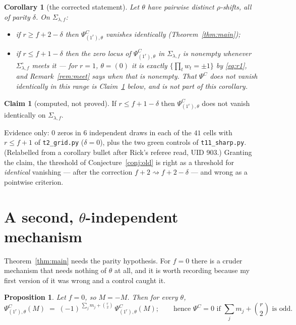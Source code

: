 \documentclass[11pt]{article}
\newtheorem{proposition}[theorem]{Proposition}
\newtheorem{corollary}[theorem]{Corollary}
\theoremstyle{definition}
\newtheorem{claim}{Claim}
\theoremstyle{remark}
\newcommand{\PsiC}{\Psi^{C}}
\newcommand{\bftheta}{\theta}
\begin{document}
\begin{corollary}[the corrected statement]\label{cor:corrected}
Let $\bftheta$ have pairwise distinct $\rho$-shifts, all of parity $\delta$. On
$\Sigma_{\lambda,f}$:
\begin{itemize}
\item if $r\ge f+2-\delta$ then $\PsiC_{(1^r),\bftheta}$ vanishes \emph{identically}
      (Theorem~\ref{thm:main});
\item if $r\le f+1-\delta$ then the zero locus of $\PsiC_{(1^r),\bftheta}$ in
      $\Sigma_{\lambda,f}$ is nonempty whenever $\Sigma^{\circ}_{\lambda,f}$ meets
      it --- for $r=1$, $\bftheta=(0)$ it is exactly $\{\prod_tw_t=\pm1\}$ by
      \eqref{eq:r1}, and Remark~\ref{rem:meet} says when that is nonempty. That
      $\PsiC$ does \emph{not} vanish identically in this range is Claim~\ref{cl:nonvan}
      below, and is not part of this corollary.
\end{itemize}
\end{corollary}

\begin{claim}[computed, not proved]\label{cl:nonvan}
If $r\le f+1-\delta$ then $\PsiC_{(1^r),\bftheta}$ does not vanish identically on
$\Sigma_{\lambda,f}$.
\end{claim}
Evidence only: $0$ zeros in $6$ independent draws in each of the $41$ cells with
$r\le f+1$ of \texttt{t2\_grid.py} ($\delta=0$), plus the two green controls of
\texttt{t11\_sharp.py}. (Relabelled from a corollary bullet after Rick's referee read,
UID 903.) Granting the claim, the threshold of Conjecture~\ref{conj:old} is right as a
threshold for \emph{identical} vanishing --- after the correction
$f+2\rightsquigarrow f+2-\delta$ --- and wrong as a pointwise criterion.

\section{A second, \texorpdfstring{$\bftheta$}{theta}-independent mechanism}

Theorem~\ref{thm:main} needs the parity hypothesis. For $f=0$ there is a cruder
mechanism that needs nothing of $\bftheta$ at all, and it is worth recording because my
first version of it was wrong and a control caught it.

\begin{proposition}\label{prop:global}
Let $f=0$, so $M=-M$. Then for every $\bftheta$,
\[
  \PsiC_{(1^r),\bftheta}(M)\;=\;(-1)^{\,\sum_j m_j+\binom r2}\,\PsiC_{(1^r),\bftheta}(M);
  \qquad\text{hence }\PsiC=0\text{ if }\textstyle\sum_j m_j+\binom r2\text{ is odd.}
\]
\end{proposition}
\end{document}
